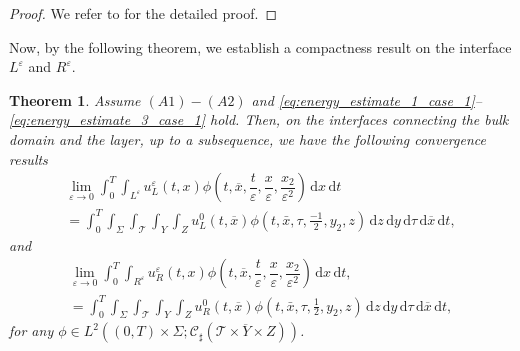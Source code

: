 \documentclass[11pt]{article}
\newtheorem{theorem}{Theorem}
\def\es{\varepsilon}
\def\mint{\int_{0}^{T}\int_{\Sigma}\int_{\mathcal{T}}\int_{Y}\int_{Z}}
\def\dzdy{\di{z}\di{y}\di{\tau}\di{\overline{x}}\di{t}}
\def\T{\mathcal{T}}
\newcommand{\di}[1]{\,\mathrm{d}#1}
\begin{document}
\begin{proof}
    We refer to \cite[Proposition 2.1]{neuss2007effective} for the detailed proof.
\end{proof}




Now, by the following theorem, we establish a compactness result on the interface $L^\es$ and $R^\es$.
\begin{theorem}\label{theorem: convergence in the layer left}
     Assume $(A1)-(A2)$ and \eqref{eq:energy_estimate_1_case_1}--\eqref{eq:energy_estimate_3_case_1} hold. Then, on the interfaces connecting the bulk domain and the layer, up to a subsequence, we have the following convergence results
    \begin{multline*}
       \lim_{\es \rightarrow 0} \int_0^T\int_{L^\es} u_L^\es(t,x)\phi\left(t,\overline{x},\dfrac{t}{\es}, \dfrac{x}{\es},\dfrac{x_2}{\es^2}\right)\di{x}\di{t}\\
       =\mint u_L^0(t,\overline{x})\phi(t,\bar x,\tau,\tfrac {-1}2,y_2,z)\dzdy,
    \end{multline*}
    and 
    \begin{multline*}
       \lim_{\es \rightarrow 0} \int_0^T\int_{R^\es} u_R^\es(t,x)\phi\left(t,\overline{x},\dfrac{t}{\es}, \dfrac{x}{\es},\dfrac{x_2}{\es^2}\right)\di{x}\di{t},\\
       =\mint u_R^0(t,\overline{x})\phi(t,\bar x, \tau,\tfrac 12,y_2,z)\dzdy,
    \end{multline*}
    for any $\phi \in L^2((0,T)\times \Sigma;\mathcal{C}_{\sharp}(\overline{\T\times Y\times Z}))$.
\end{theorem}
\end{document}
